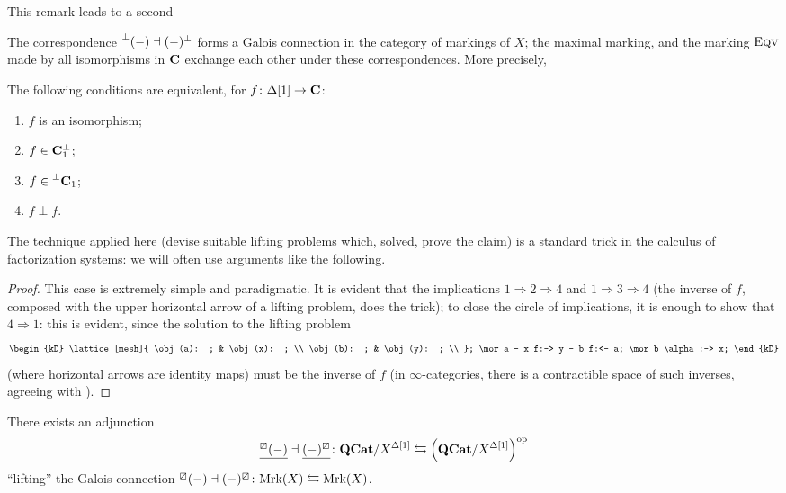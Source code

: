 This remark leads to a second
\begin{remark}
The correspondence $\prescript{\perp}{}(-)\dashv (-)^\perp$ forms a Galois connection in the category of markings of $X$; the maximal marking, and the marking $\text{\scshape Eqv}$ made by all isomorphisms in $\mathbf{C}$ exchange each other under these correspondences. More precisely,
\end{remark}
\begin{proposition}\label{prop:iso.are.ortho.to.all}
The following conditions are equivalent, for $f\colon \Delta[1]\to \mathbf{C}$:
\begin{enumerate}
\item $f$ is an isomorphism;
\item $f\in \mathbf{C}_1^\perp$;
\item $f\in \prescript{\perp}{}{\mathbf{C}_1}$;
\item $f\perp f$.
\end{enumerate}
\begin{remark}
The technique applied here (devise suitable lifting problems which, solved, prove the claim) is a standard trick in the calculus of factorization systems: we will often use arguments like the following.
\end{remark}
\begin{proof}
This case is extremely simple and paradigmatic. It is evident that the implications $1 \Rightarrow 2 \Rightarrow 4$ and $1 \Rightarrow 3 \Rightarrow 4$ (the inverse of $f$, composed with the upper horizontal arrow of a lifting problem, does the trick); to close the circle of implications, it is enough to show that $4 \Rightarrow 1$: this is evident, since the solution to the lifting problem
\[
\begin{kD}
\lattice[mesh]{
	\obj (a): ; & \obj (x): ; \\
	\obj (b): ; & \obj (y): ; \\
};
\mor a - x f:-> y - b f:<- a;
\mor b \alpha:-> x;
\end{kD}
\]
(where horizontal arrows are identity maps) must be the inverse of $f$ (in $\infty$\hyp{}categories, there is a contractible space of such inverses, agreeing with \adef {}).
\end{proof}
\end{proposition}
\begin{proposition}
There exists an adjunction  \[\underline{{}^\boxslash(-)}\dashv \underline{(-)^\boxslash}\colon \mathbf{QCat}/X^{\Delta[1]}\leftrightarrows\left(\mathbf{QCat}
/X^{\Delta[1]}\right)^{\text{op}}
\]
``lifting'' the Galois connection ${}^\boxslash(-)\dashv (-)^\boxslash\colon \text{Mrk}(X)\leftrightarrows \text{Mrk}(X)$.\end{proposition}
